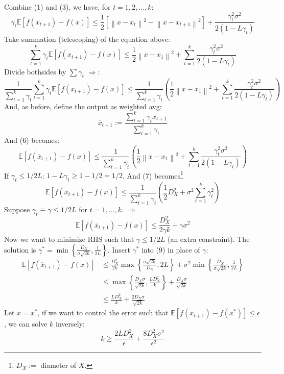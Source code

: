 \documentclass[a4paper, 11pt]{article}
\begin{document}
Combine (1) and (3), we have, for $t=1,2,...,k$:
\begin{equation}
  \gamma_t \mathbb{E}\left[f(x_{t+1})-f(x)\right] \leq \frac{1}{2} \left[\left\|x-x_t\right\|^2 - \left\|x-x_{t+1}\right\|^2\right] + \frac{\gamma_t^2\sigma^2}{2(1-L \gamma_t)}
\end{equation}
Take summation (telescoping) of the equation above:
\begin{equation}
  \sum_{t=1}^k \gamma_t \mathbb{E}\left[f(x_{t+1})-f(x)\right] \leq \frac{1}{2} \left\|x-x_1\right\|^2 + \sum_{t=1}^k \frac{\gamma_t^2\sigma^2}{2(1-L \gamma_t)}
\end{equation}
Divide bothsides by $\sum \gamma_t$ $\Rightarrow$:
\begin{equation}
  \frac{1}{\sum_{t=1}^k \gamma_t}\sum_{t=1}^k \gamma_t \mathbb{E}\left[f(x_{t+1})-f(x)\right] \leq \frac{1}{\sum_{t=1}^k \gamma_t}\left(\frac{1}{2} \left\|x-x_1\right\|^2 + \sum_{t=1}^k \frac{\gamma_t^2\sigma^2}{2(1-L \gamma_t)}\right)
\end{equation}
And, as before, define the output as weighted avg:
$$
\overline{x}_{t+1} := \frac{\sum_{t=1}^k \gamma_t x_{t+1}}{\sum_{t=1}^k \gamma_t}
$$
And (6) becomes:
\begin{equation}
  \mathbb{E}\left[f(\overline{x}_{t+1})-f(x)\right] \leq \frac{1}{\sum_{t=1}^k \gamma_t}\left(\frac{1}{2} \left\|x-x_1\right\|^2 + \sum_{t=1}^k \frac{\gamma_t^2\sigma^2}{2(1-L \gamma_t)}\right)
\end{equation}
If $\gamma_t\leq 1/2L$: $1-L \gamma_t \geq 1-1/2 = 1/2$. And (7) becomes\footnote{$D_X:=$ diameter of $X$.}
\begin{equation}
  \mathbb{E}\left[f(\overline{x}_{t+1})-f(x)\right] \leq \frac{1}{\sum_{t=1}^k \gamma_t}\left(\frac{1}{2}D^2_X + \sigma^2 \sum_{t=1}^k \gamma_t^2\right)
\end{equation}
Suppose $\gamma_t \equiv \gamma \leq 1/2L$ for $t=1,...,k$. $\Rightarrow$
\begin{equation}
  \mathbb{E}\left[f(\overline{x}_{t+1})-f(x)\right] \leq \frac{D_X^2}{2 \gamma k} + \gamma \sigma^2
\end{equation}
Now we want to minimize RHS such that $\gamma \leq 1/2L$ (an extra constraint). The solution is $\gamma^* = \min\left\{\frac{D_X}{\sigma \sqrt{2k}}, \frac{1}{2L}\right\}$. Insert $\gamma^*$ into (9) in place of $\gamma$:
\begin{equation}
\begin{split}
    \mathbb{E}\left[f(\overline{x}_{t+1})-f(x)\right] &\leq \frac{D_X^2}{2 k} \max\left\{\frac{\sigma \sqrt{2k}}{D_X}, 2L\right\} +  \sigma^2 \min\left\{\frac{D_X}{\sigma \sqrt{2k}}, \frac{1}{2L}\right\} \\
    &\leq \max\left\{\frac{D_X\sigma}{\sqrt{2k}}, \frac{LD_X^2}{k}\right\} + \frac{D_X \sigma}{\sqrt{2k}}\\
    &\leq \frac{LD_X^2}{k} + \frac{2D_X \sigma}{\sqrt{2k}}
\end{split}
\end{equation}
Let $x=x^*$, if we want to control the error such that $\mathbb{E}\left[f(\overline{x}_{t+1})-f(x^*)\right] \leq \epsilon$, we can solve $k$ inversely: 
$$
k \geq \frac{2L D_X^2}{\epsilon} + \frac{8 D_X^2 \sigma^2}{\epsilon^2}
$$
\end{document}
